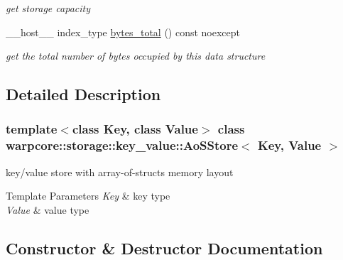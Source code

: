 \begin{DoxyCompactItemize}
\begin{DoxyCompactList}\small\item\em get storage capacity \end{DoxyCompactList}\item 
\+\_\+\+\_\+host\+\_\+\+\_\+ index\+\_\+type \hyperlink{classwarpcore_1_1storage_1_1key__value_1_1AoSStore_afe4d4e5048411c0d09a625c6447c19b6}{bytes\+\_\+total} () const noexcept
\begin{DoxyCompactList}\small\item\em get the total number of bytes occupied by this data structure \end{DoxyCompactList}\end{DoxyCompactItemize}


\subsection{Detailed Description}
\subsubsection*{template$<$class Key, class Value$>$\newline
class warpcore\+::storage\+::key\+\_\+value\+::\+Ao\+S\+Store$<$ Key, Value $>$}

key/value store with array-\/of-\/structs memory layout 


\begin{DoxyTemplParams}{Template Parameters}
{\em Key} & key type \\
\hline
{\em Value} & value type \\
\hline
\end{DoxyTemplParams}


\subsection{Constructor \& Destructor Documentation}
\mbox{\label{classwarpcore_1_1storage_1_1key__value_1_1AoSStore_a4ab568a9090dfe80c989ba7d88173010}} 
